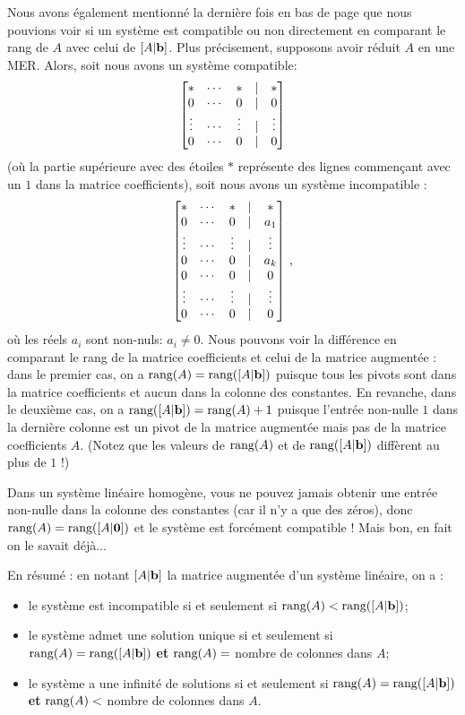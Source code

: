 \medskip
Nous avons également mentionné la dernière fois en bas de page que nous pouvions voir si un système est
compatible ou non directement en comparant le rang de $A$ avec celui de $[A|\mathbf{b}]$. Plus pr\'ecisement,
supposons avoir réduit $A$ en une MER.  Alors, soit nous avons un système compatible:
$$
\left[ \begin{matrix}  * & \cdots & * &|& *\\
0 & \cdots & 0 &|& 0\\
\vdots & \cdots & \vdots&|& \vdots\\
0 & \cdots & 0 &|& 0 \end{matrix} \right]
$$
(où la partie supérieure avec des étoiles $*$
représente des lignes commençant avec un $1$ dans la matrice coefficients), soit nous avons un système incompatible :
$$
\left[ \begin{matrix}  * & \cdots & * &|& *\\
0 & \cdots & 0 &|& a_1\\
\vdots & \cdots & \vdots&|& \vdots\\
0 & \cdots & 0 &|& a_k\\
0 & \cdots & 0 &|& 0\\
\vdots & \cdots & \vdots&|& \vdots\\
0 & \cdots & 0 &|& 0 \end{matrix} \right]\,,
$$ 
où les réels $a_i$ sont non-nuls: $a_i\not=0$.
Nous pouvons voir la différence en comparant
le rang de la matrice coefficients et celui de la matrice augmentée :
dans le premier cas, on a $\textrm{rang}(A) = \textrm{rang}([A|\mathbf{b}])$ puisque tous les pivots sont dans la  matrice coefficients et aucun dans la colonne des constantes.
En revanche, dans le deuxi\`eme cas, on a $\textrm{rang}([A|\mathbf{b}])=\textrm{rang}(A) +1$ puisque l'entrée non-nulle $1$ dans la dernière colonne est un pivot de la matrice augmentée mais pas de la matrice coefficients $A$.
(Notez que les valeurs de $\textrm{rang}(A)$ et de $\textrm{rang}([A|\mathbf{b}])$ diffèrent au plus de $1$ !)


\begin{myexample} Dans un système linéaire homogène, vous ne pouvez jamais obtenir une entrée non-nulle
dans la colonne des constantes (car il n'y a que des zéros), donc $\textrm{rang}(A) = \textrm{rang}([A|\mathbf{0}])$ et le
système est forcément compatible ! Mais bon, en fait on le savait déjà...\end{myexample}

\medskip
En résumé : en notant $[A|\mathbf{b}]$ la matrice augmentée d'un système linéaire, on a :
\begin{itemize}
\item le système est incompatible si et seulement si $\textrm{rang}(A) < \textrm{rang}([A|\mathbf{b}])$;
\item le système admet une solution unique si et seulement si $\textrm{rang}(A)=\textrm{rang}([A|\mathbf{b}])$
{\bf et} $\textrm{rang}(A) = $ nombre de colonnes dans $A$;
\item le système a une infinité de solutions si et seulement si $\textrm{rang}(A)=\textrm{rang}([A|\mathbf{b}])$ {\bf et}  $\textrm{rang}(A) < $ nombre de colonnes dans $A$.
\end{itemize}


